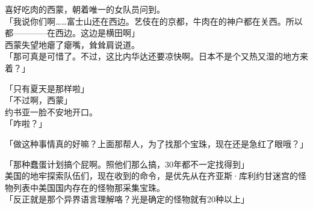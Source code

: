 喜好吃肉的西蒙，朝着唯一的女队员问到。\\

「我说你们啊……富士山还在西边。艺伎在的京都，牛肉在的神户都在关西。所以都————在西边。这边是横田啊」\\

西蒙失望地瘪了瘪嘴，耸耸肩说道。\\

「那可真是可惜了。不过，这比内华达还要凉快啊。日本不是个又热又湿的地方来着？」

「只有夏天是那样啦」\\

「不过啊，西蒙」\\

约书亚一脸不安地开口。\\

「咋啦？」

「做这种事情真的好嘛？上面那帮人，为了找那个宝珠，现在还是急红了眼哦？」

「那种蠢蛋计划搞个屁啊。照他们那么搞，30年都不一定找得到」\\

美国的地牢探索队伍们，现在收到的命令，是优先从在齐亚斯·库利约甘迷宫的怪物列表中美国国内存在的怪物那采集宝珠。\\

「反正就是那个异界语言理解咯？光是确定的怪物就有20种以上」


